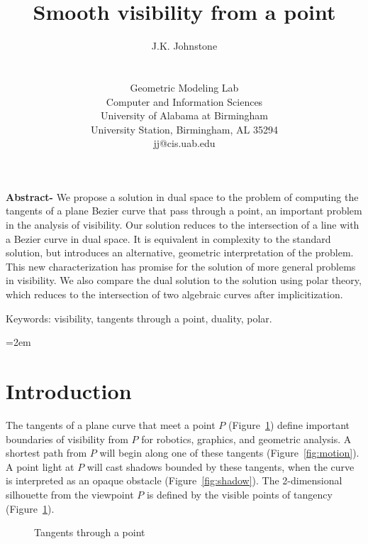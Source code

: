 \documentclass[twocolumn,10pt]{article}
\begin{document}
\title{Smooth visibility from a point}
\author{J.K. Johnstone \\
  	\quad\\
	\\
	Geometric Modeling Lab \\
	Computer and Information Sciences \\
	University of Alabama at Birmingham \\
	University Station, Birmingham, AL 35294 \\
	jj@cis.uab.edu
}
\date{\quad}
\maketitle
\thispagestyle{empty}
{\small
\parskip=12pt
\parindent=0pt

{\bf Abstract-} We propose a solution in dual space to the problem of
computing the tangents of a plane Bezier curve that pass through a point,
an important problem in the analysis of visibility.
Our solution reduces to the intersection of a line with a Bezier curve
in dual space.
It is equivalent in complexity to the standard solution,
but introduces an alternative, geometric interpretation of the problem.
This new characterization has promise for the solution of more general problems in visibility.
We also compare the dual solution to the solution using polar theory,
which reduces to the intersection of two algebraic curves after implicitization.

Keywords: visibility, tangents through a point, duality, polar.
}


\parindent=2em
\section{Introduction}

The tangents of a plane curve that meet a point $P$ (Figure~\ref{fig:problem})
define important boundaries of visibility from $P$
for robotics, graphics, and geometric analysis.
A shortest path from $P$ will begin along one of these tangents 
(Figure~\ref{fig:motion}).
A point light at $P$ will cast shadows bounded by these tangents,
when the curve is interpreted as an opaque obstacle (Figure~\ref{fig:shadow}).
The 2-dimensional silhouette from the viewpoint $P$
is defined by the visible points of tangency (Figure~\ref{fig:problem}).



\begin{figure}
\hspace{.5in} \setjjpopr
\caption{Tangents through a point}
\label{fig:problem}
\end{figure}
\end{document}
